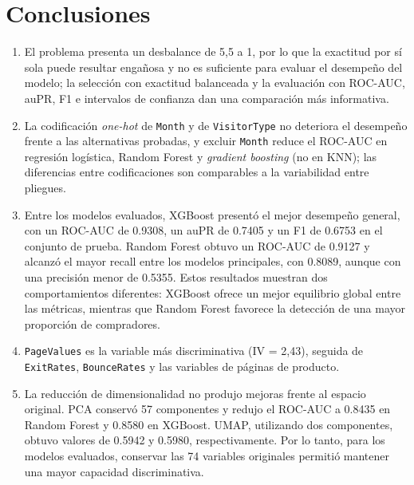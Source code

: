 \documentclass[conference]{IEEEtran}
\begin{document}
\section{Conclusiones}
\begin{enumerate}
\item El problema presenta un desbalance de 5,5 a 1, por lo que la exactitud por sí sola puede resultar engañosa y no es suficiente para evaluar el desempeño del modelo; la selección con exactitud balanceada y la evaluación con ROC-AUC, auPR, F1 e intervalos de confianza dan una comparación más informativa.
\item La codificación \emph{one-hot} de \texttt{Month} y de \texttt{VisitorType} no deteriora el desempeño frente a las alternativas probadas, y excluir \texttt{Month} reduce el ROC-AUC en regresión logística, Random Forest y \emph{gradient boosting} (no en KNN); las diferencias entre codificaciones son comparables a la variabilidad entre pliegues.
\item Entre los modelos evaluados, XGBoost presentó el mejor desempeño general, con un ROC-AUC de 0.9308, un auPR de 0.7405 y un F1 de 0.6753 en el conjunto de prueba. Random Forest obtuvo un ROC-AUC de 0.9127 y alcanzó el mayor recall entre los modelos principales, con 0.8089, aunque con una precisión menor de 0.5355. Estos resultados muestran dos comportamientos diferentes: XGBoost ofrece un mejor equilibrio global entre las métricas, mientras que Random Forest favorece la detección de una mayor proporción de compradores.
\item \texttt{PageValues} es la variable más discriminativa (IV = 2,43), seguida de \texttt{ExitRates}, \texttt{BounceRates} y las variables de páginas de producto.
\item La reducción de dimensionalidad no produjo mejoras frente al espacio original. PCA conservó 57 componentes y redujo el ROC-AUC a 0.8435 en Random Forest y 0.8580 en XGBoost. UMAP, utilizando dos componentes, obtuvo valores de 0.5942 y 0.5980, respectivamente. Por lo tanto, para los modelos evaluados, conservar las 74 variables originales permitió mantener una mayor capacidad discriminativa.
\end{enumerate}
\end{document}
